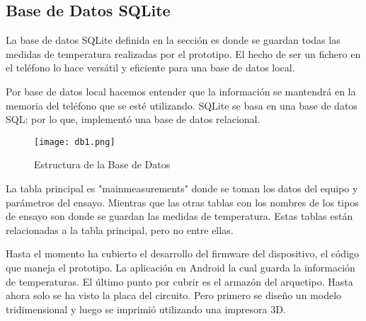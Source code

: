 \subsection{Base de Datos SQLite}

\par \noindent
La base de datos SQLite definida en la sección es donde se guardan todas las medidas de temperatura realizadas por el prototipo. El hecho de ser un fichero en el teléfono lo hace versátil y eficiente para una base de datos local. 


\par \noindent
Por base de datos local hacemos entender que la información se mantendrá en la memoria del teléfono que se esté utilizando. SQLite se basa en una base de datos SQL; por lo que, implementó una base de datos relacional. 

\begin{figure}[H]
	\centering
	\texttt{[image: db1.png]}
	\caption{Estructura de la Base de Datos}
\end{figure}

\clearpage

\par \noindent
La tabla principal es "mainmeasurements" donde se toman los datos del equipo y parámetros del ensayo. Mientras que las otras tablas con los nombres de los tipos de ensayo son donde se guardan las medidas de temperatura. Estas tablas están relacionadas a la tabla principal, pero no entre ellas.


\par \noindent
Hasta el momento ha cubierto el desarrollo del firmware del dispositivo, el código que maneja el prototipo. La aplicación en Android la cual guarda la información de temperaturas. El último punto por cubrir es el armazón del arquetipo. Hasta ahora solo se ha visto la placa del circuito. Pero primero se diseño un modelo tridimensional y luego se imprimió utilizando una impresora 3D.

